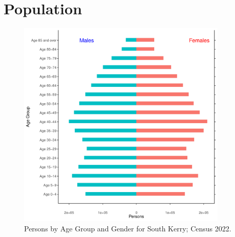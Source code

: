 \documentclass{article}
\begin{document}
\pagebreak

\section{Population} 
\label{sect:Pop}

\begin{figure}[h]
	\centering
	\includegraphics[width = 100mm]{../figures/PyramidPlot.pdf}
	\caption{Persons by Age Group and Gender for South Kerry; Census 2022.}
	\label{fig:2ae19629-1a6a-13a3-e055-000000000001}
	\end{figure}
\end{document}
